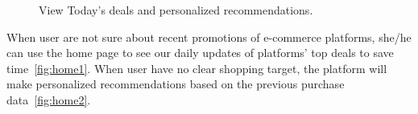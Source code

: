 \begin{figure}[t!]
	\caption{View Today's deals and personalized recommendations.}\vspace{-3ex}
	\label{fig:home}
\end{figure}
When user are not sure about recent promotions of e-commerce platforms, she/he can use the home page to see our daily updates of platforms' top deals to save time~\ref{fig:home1}. When user have no clear shopping target, the platform will make personalized recommendations based on the previous purchase data~\ref{fig:home2}.

